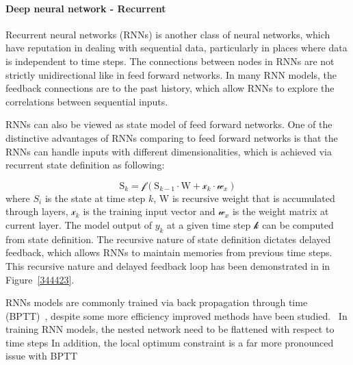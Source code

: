 \paragraph{Deep neural network - Recurrent}
Recurrent neural networks (RNNs) is another class of neural networks, which have reputation in dealing with sequential data, particularly in places where data is independent to time steps. The connections between nodes in RNNs are not strictly unidirectional like in feed forward networks. In many RNN models, the feedback connections are to the past history, which allow RNNs to explore the correlations between sequential inputs.   
\par 
RNNs can also be viewed as state model of feed forward networks. One of the distinctive advantages of RNNs comparing to feed forward networks is that the RNNs can handle inputs with different dimensionalities, which is achieved via recurrent state definition as following:

\begin{equation}
    \mathrm{S}_k = \mathcal{f}(\mathrm{S}_{k-1} \cdot \mathrm{W} + \mathcal{x}_k \cdot \mathcal{w}_x)
\end{equation}
where $S_i$ is the state at time step $k$, $\mathrm{W}$ is recursive weight that is accumulated through layers, $\mathcal{x}_k$ is the training input vector and $\mathcal{w}_x$ is the weight matrix at current layer. The model output of $y_k$ at a given time step $\mathcal{k}$ can be computed from state definition. The recursive nature of state definition dictates delayed feedback, which allows RNNs to maintain memories from previous time steps. This recursive nature and delayed feedback loop has been demonstrated in in Figure~\ref{344423}. 
\par 
RNNs models are commonly trained via back propagation through time (BPTT)~\cite{Goodfellow-et-al-2016}, despite some more efficiency improved methods have been studied.~\cite{963769,neco.1989,Gomez:2008:ANE:1390681.1390712} In training RNN models, the nested network need to be flattened with respect to time steps
In addition, the local optimum constraint is a far more pronounced issue with BPTT~